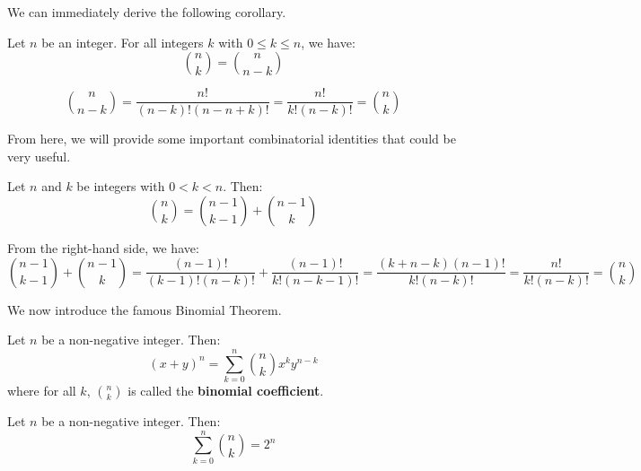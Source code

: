 \documentclass{huhtakm-template-book-v2}
\begin{document}
    We can immediately derive the following corollary.
    \begin{cor}
        Let $n$ be an integer. For all integers $k$ with $0 \leq k \leq n$, we have:
        \begin{equation*}
            \binom{n}{k} = \binom{n}{n-k}
        \end{equation*}
    \end{cor}
    \begin{proofing}
        \begin{equation*}
            \binom{n}{n-k} = \frac{n!}{(n-k)!(n-n+k)!} = \frac{n!}{k!(n-k)!} = \binom{n}{k}
        \end{equation*}
    \end{proofing}
    \newpage

    From here, we will provide some important combinatorial identities that could be very useful.
    \begin{thm}
        Let $n$ and $k$ be integers with $0 < k < n$. Then:
        \begin{equation*}
            \binom{n}{k} = \binom{n-1}{k-1}+\binom{n-1}{k}
        \end{equation*}
    \end{thm}
    \begin{proofing}
        From the right-hand side, we have:
        \begin{equation*}
            \binom{n-1}{k-1}+\binom{n-1}{k} = \frac{(n-1)!}{(k-1)!(n-k)!}+\frac{(n-1)!}{k!(n-k-1)!} = \frac{(k+n-k)(n-1)!}{k!(n-k)!} = \frac{n!}{k!(n-k)!} = \binom{n}{k}
        \end{equation*}
    \end{proofing}
    We now introduce the famous Binomial Theorem.
    \begin{thm}
        Let $n$ be a non-negative integer. Then:
        \begin{equation*}
            (x+y)^{n} = \sum_{k = 0}^{n}\binom{n}{k}x^{k}y^{n-k}
        \end{equation*} 
        where for all $k$, $\binom{n}{k}$ is called the \textbf{binomial coefficient}.
    \end{thm}
    \begin{cor}
        Let $n$ be a non-negative integer. Then:
        \begin{equation*}
            \sum_{k = 0}^{n}\binom{n}{k} = 2^{n}
        \end{equation*}
    \end{cor}
\end{document}
